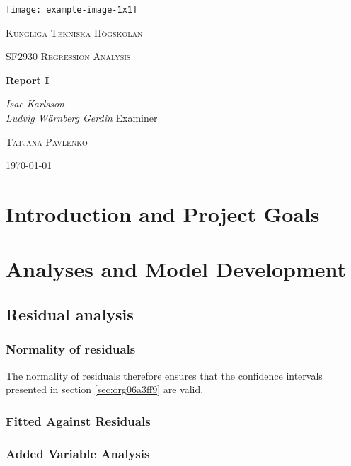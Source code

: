 \documentclass[11pt]{article}
\author{Ludde}
\date{\today}
\title{}
\begin{document}
\begin{titlepage}
\centering
\texttt{[image: example-image-1x1]}\par\vspace{1cm}
{\scshape\LARGE Kungliga Tekniska Högskolan \par}
\vspace{1cm}
{\scshape\Large SF2930 Regression Analysis \par}
\vspace{1.5cm}
{\huge\bfseries Report I \\  \par}
\vspace{2cm}
{\Large\itshape Isac Karlsson\\ Ludvig Wärnberg Gerdin}
\vfill
Examiner \par
\textsc{Tatjana Pavlenko}

\vfill

{\large \today\par}
\end{titlepage}

\newpage
\tableofcontents
\newpage

\section{Introduction and Project Goals}
\label{sec:org0bfdbac}
\section{Analyses and Model Development}
\label{sec:org68d6ee7}
\subsection{Residual analysis}
\label{sec:org3450992}
\subsubsection{Normality of residuals}
\label{sec:orgd303dcc}

The normality of residuals therefore ensures that the confidence intervals presented in section \ref{sec:org06a3ff9}
are valid.

\subsubsection{Fitted Against Residuals}
\label{sec:org4d205a2}
\subsubsection{Added Variable Analysis}
\label{sec:orga5578fd}
\end{document}
